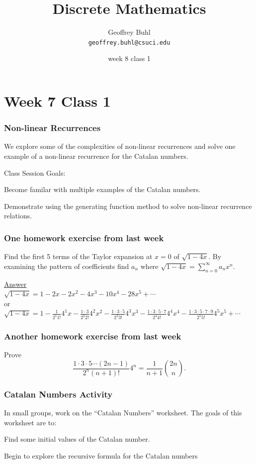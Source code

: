 \documentclass[xcolor=table]{beamer}
\title{Discrete Mathematics}
\author[Geoffrey Buhl]{Geoffrey Buhl \\ \texttt{geoffrey.buhl@csuci.edu}}
\institute[CSUCI]{California State University Channel Islands}
\date{week 8 class 1}
\newenvironment{packed_enum}{
\begin{enumerate}
  \setlength{\itemsep}{1pt}
  \setlength{\parskip}{0pt}
  \setlength{\parsep}{0pt}
}{\end{enumerate}}
\begin{document}


\section{Week 7 Class 1}


\frame
{
  \frametitle{Non-linear Recurrences}

We explore some of the complexities of non-linear recurrences and solve one example of a non-linear recurrence for the Catalan numbers.

\vfill
Class Session Goals:
\begin{packed_enum}
\item Become familar with multiple examples of the Catalan numbers.
\item Demonstrate using the generating function method to solve non-linear recurrence relations.
\end{packed_enum}
\vfill
}

\frame
{
  \frametitle{One homework exercise from last week}

Find the first 5 terms of the Taylor expansion at $x=0$ of $\sqrt{1-4x}$.  By examining the pattern of coefficients find $a_n$ where $\sqrt{1-4x}=\sum_{n=0}^{\infty}a_nx^n$.\vfill

\underline{Answer}\\
$\sqrt{1-4x}=1-2 x-2 x^2-4 x^3-10 x^4-28 x^5+\cdots$\\
or\\
$\sqrt{1-4x}=1-\frac{1}{2^1 1!}4^1x-\frac{1\cdot 3}{2^2 2!}4^2 x^2-\frac{1\cdot 3 \cdot 5}{2^3 3!}4^3 x^3-\frac{1\cdot 3 \cdot 5 \cdot 7}{2^4 4!}4^4 x^4-\frac{1\cdot 3 \cdot 5 \cdot 7 \cdot 9}{2^5 5!}4^5 x^5+\cdots$
}

\frame
{
  \frametitle{Another homework exercise from last week}


Prove $$\frac{1\cdot 3 \cdot 5 \cdots (2n-1)}{2^n (n+1)!}4^n=\frac{1}{n+1} \binom{2n}{n}.$$


}



\frame
{
  \frametitle{Catalan Numbers Activity}

In small groups, work on the ``Catalan Numbers'' worksheet. The goals of this worksheet are to:
\vfill
\begin{packed_enum}
\item Find some initial values of the Catalan number.
\item Begin to explore the recursive formula for the Catalan numbers
\end{packed_enum}
\pause
\vfill


}
\end{document}
